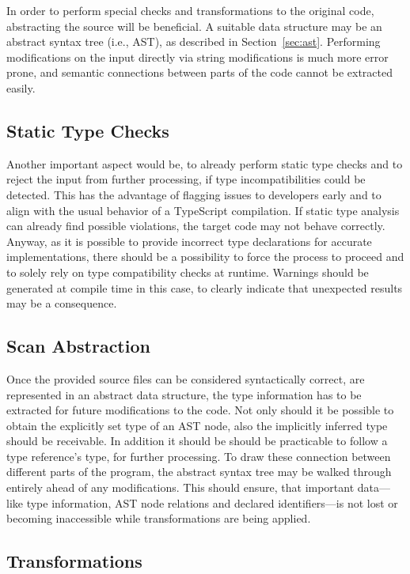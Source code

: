 In order to perform special checks and transformations to the original code, abstracting the source will be beneficial. A suitable data structure may be an abstract syntax tree (i.e., AST), as described in Section~\ref{sec:ast}. Performing modifications on the input directly via string modifications is much more error prone, and semantic connections between parts of the code cannot be extracted easily.

\subsection{Static Type Checks}

Another important aspect would be, to already perform static type checks and to reject the input from further processing, if type incompatibilities could be detected. This has the advantage of flagging issues to developers early and to align with the usual behavior of a TypeScript compilation. If static type analysis can already find possible violations, the target code may not behave correctly. Anyway, as it is possible to provide incorrect type declarations for accurate implementations, there should be a possibility to force the process to proceed and to solely rely on type compatibility checks at runtime. Warnings should be generated at compile time in this case, to clearly indicate that unexpected results may be a consequence.

\subsection{Scan Abstraction}

Once the provided source files can be considered syntactically correct, are represented in an abstract data structure, the type information has to be extracted for future modifications to the code. Not only should it be possible to obtain the explicitly set type of an AST node, also the implicitly inferred type should be receivable. In addition it should be should be practicable to follow a type reference's type, for further processing. To draw these connection between different parts of the program, the abstract syntax tree may be walked through entirely ahead of any modifications. This should ensure, that important data---like type information, AST node relations and declared identifiers---is not lost or becoming inaccessible while transformations are being applied.

\subsection{Transformations}

